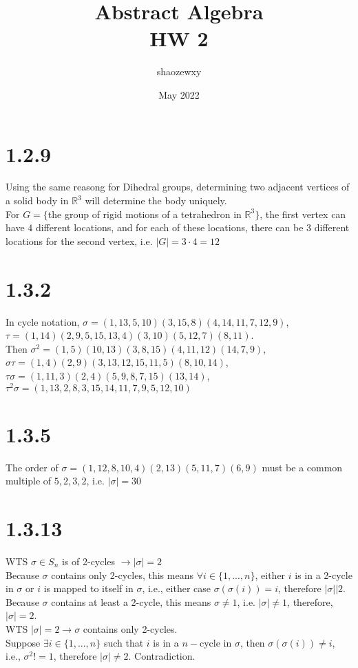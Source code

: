 \documentclass{article}
\title{Abstract Algebra\\
\large{HW 2}}
\author{shaozewxy }
\date{May 2022}
\begin{document}
\maketitle

\setcounter{secnumdepth}{0}
\section{1.2.9}
\begin{addmargin}[1em]{0em}
Using the same reasong for Dihedral groups, determining two adjacent vertices of a solid body in $\mathbb{R}^3$ will determine the body uniquely.\\
For $G = \{$the group of rigid motions of a tetrahedron in $\mathbb{R}^3\}$, the first vertex can have $4$ different locations, and for each of these locations, there can be $3$ different locations for the second vertex, i.e. $|G| = 3 \cdot 4 = 12$
\end{addmargin}
\section{1.3.2}
\begin{addmargin}[1em]{0em}
In cycle notation, $\sigma = (1,13,5,10)(3,15,8)(4,14,11,7,12,9)$,\\$\tau = (1,14)(2,9,5,15,13,4)(3,10)(5,12,7)(8,11)$.\\
Then $\sigma^2 = (1,5)(10,13)(3,8,15)(4,11,12)(14,7,9)$,\\
$\sigma\tau = (1,4)(2,9)(3,13,12,15,11,5)(8,10,14)$,\\
$\tau\sigma = (1,11,3)(2,4)(5,9,8,7,15)(13,14)$,\\
$\tau^2\sigma = (1,13,2,8,3,15,14,11,7,9,5,12,10)$
\end{addmargin}
\section{1.3.5}
\begin{addmargin}[1em]{0em}
The order of $\sigma = (1,12,8,10,4)(2,13)(5,11,7)(6,9)$ must be a common multiple of $5,2,3,2$, i.e. $|\sigma| = 30$
\end{addmargin}
\section{1.3.13}
\begin{addmargin}[1em]{0em}
WTS $\sigma \in S_n$ is of 2-cycles $\rightarrow |\sigma| = 2$\\
Because $\sigma$ contains only 2-cycles, this means $\forall i \in \{1,...,n\}$, either $i$ is in a 2-cycle in $\sigma$ or $i$ is mapped to itself in $\sigma$, i.e., either case $\sigma (\sigma(i)) = i$, therefore $|\sigma| | 2$. Because $\sigma$ contains at least a 2-cycle, this means $\sigma \neq 1$, i.e. $|\sigma| \neq 1$, therefore, $|\sigma| = 2$.\\
WTS $|\sigma| = 2\rightarrow \sigma$ contains only 2-cycles.\\
Suppose $\exists i \in \{1,...,n\}$ such that $i$ is in a $n-$cycle in $\sigma$, then $\sigma(\sigma(i)) \neq i$, i.e., $\sigma ^2 != 1$, therefore $|\sigma| \neq 2$. Contradiction.
\end{addmargin}
\end{document}

